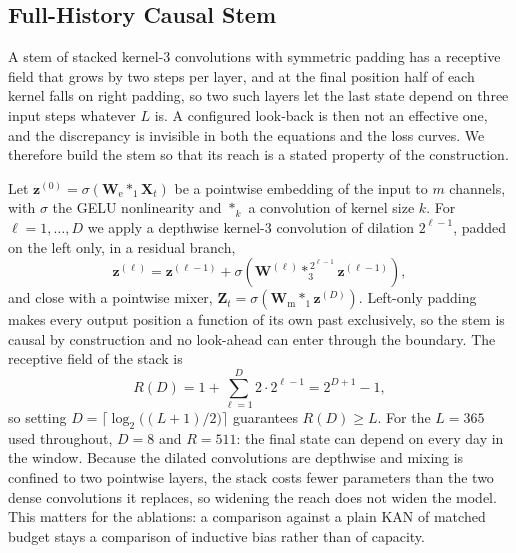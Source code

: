 \subsection{Full-History Causal Stem}
\label{sec:stem}
A stem of stacked kernel-3 convolutions with symmetric padding has a receptive field that grows by two steps per layer, and at the final position half of each kernel falls on right padding, so two such layers let the last state depend on three input steps whatever $L$ is. A configured look-back is then not an effective one, and the discrepancy is invisible in both the equations and the loss curves. We therefore build the stem so that its reach is a stated property of the construction.

Let $\mathbf{z}^{(0)}=\sigma(\mathbf{W}_{\mathrm{e}}\ast_1\mathbf{X}_t)$ be a pointwise embedding of the input to $m$ channels, with $\sigma$ the GELU nonlinearity and $\ast_k$ a convolution of kernel size $k$. For $\ell=1,\ldots,D$ we apply a depthwise kernel-3 convolution of dilation $2^{\ell-1}$, padded on the left only, in a residual branch,
\begin{equation}
\mathbf{z}^{(\ell)}=\mathbf{z}^{(\ell-1)}+\sigma\!\left(\mathbf{W}^{(\ell)}\ast_{3}^{\,2^{\ell-1}}\mathbf{z}^{(\ell-1)}\right),
\label{eq:dilated}
\end{equation}
and close with a pointwise mixer, $\mathbf{Z}_t=\sigma(\mathbf{W}_{\mathrm{m}}\ast_1\mathbf{z}^{(D)})$. Left-only padding makes every output position a function of its own past exclusively, so the stem is causal by construction and no look-ahead can enter through the boundary. The receptive field of the stack is
\begin{equation}
R(D)=1+\textstyle\sum_{\ell=1}^{D}2\cdot 2^{\ell-1}=2^{D+1}-1,
\label{eq:field}
\end{equation}
so setting $D=\lceil\log_2\!\big((L+1)/2\big)\rceil$ guarantees $R(D)\geq L$. For the $L=365$ used throughout, $D=8$ and $R=511$: the final state can depend on every day in the window. Because the dilated convolutions are depthwise and mixing is confined to two pointwise layers, the stack costs fewer parameters than the two dense convolutions it replaces, so widening the reach does not widen the model. This matters for the ablations: a comparison against a plain KAN of matched budget stays a comparison of inductive bias rather than of capacity.

